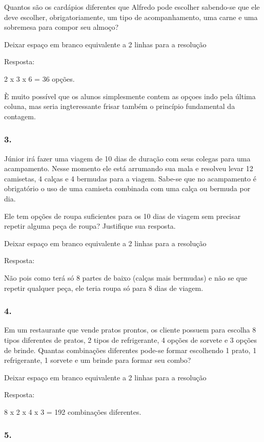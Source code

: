 Quantos são os cardápios diferentes que Alfredo pode escolher sabendo-se
que ele deve escolher, obrigatoriamente, um tipo de acompanhamento, uma
carne e uma sobremesa para compor seu almoço?

Deixar espaço em branco equivalente a 2 linhas para a resolução

Resposta:

2 x 3 x 6 = 36 opções.

È muito possível que os alunos simplesmente contem as opçoes indo pela
última coluna, mas seria ingteressante frisar também o princípio
fundamental da contagem.

\subsubsection{3.}\label{section-132}

Júnior irá fazer uma viagem de 10 dias de duração com seus colegas para
uma acampamento. Nesse momento ele está arrumando sua mala e resolveu
levar 12 camisetas, 4 calças e 4 bermudas para a viagem. Sabe-se que no
acampamento é obrigatório o uso de uma camiseta combinada com uma calça
ou bermuda por dia.

Ele tem opções de roupa suficientes para os 10 dias de viagem sem
precisar repetir alguma peça de roupa? Justifique sua resposta.

Deixar espaço em branco equivalente a 2 linhas para a resolução

Resposta:

Não pois como terá só 8 partes de baixo (calças mais bermudas) e não se
que repetir qualquer peça, ele teria roupa só para 8 dias de viagem.

\subsubsection{4.}\label{section-133}

Em um restaurante que vende pratos prontos, os cliente possuem para
escolha 8 tipos diferentes de pratos, 2 tipos de refrigerante, 4 opções
de sorvete e 3 opções de brinde. Quantas combinações diferentes pode-se
formar escolhendo 1 prato, 1 refrigerante, 1 sorvete e um brinde para
formar seu combo?

Deixar espaço em branco equivalente a 2 linhas para a resolução

Resposta:

8 x 2 x 4 x 3 = 192 combinações diferentes.

\subsubsection{5.}\label{section-134}

